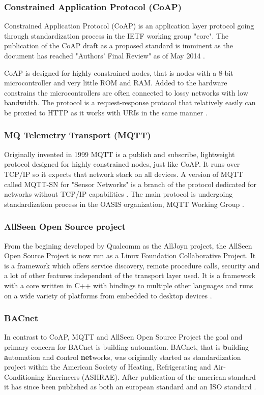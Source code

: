 \subsubsection{Constrained Application Protocol (CoAP)}
Constrained Application Protocol (CoAP) is an application layer protocol
going through standardization process in the IETF working group "core". The
publication of the CoAP draft as a proposed standard is imminent as the
document has reached "Authors' Final Review" as of May 2014 \cite{web:wgcore}.

CoAP is designed for highly constrained nodes, that is nodes with a 8-bit
microcontroller and very little ROM and RAM. Added to the hardware constrains
the microcontrollers are often connected to lossy networks with low bandwidth.
The protocol is a request-response protocol that relatively easily can be
proxied to HTTP as it works with URIs in the same manner \cite{web:draftcoap}.

\subsubsection{MQ Telemetry Transport (MQTT)}
Originally invented in 1999 MQTT is a publish and subscribe, lightweight
protocol designed for highly constrained nodes, just like CoAP. It runs
over TCP/IP so it expects that network stack on all devices. A version of MQTT
called MQTT-SN for "Sensor Networks" is a branch of the protocol dedicated for
networks without TCP/IP capabilities \cite{web:mqtt,web:mqtt-sn}. The main
protocol is undergoing standardization process in the OASIS organization, MQTT
Working Group \cite{web:oasis-mqtt}.

\subsubsection{AllSeen Open Source project}
From the begining developed by Qualcomm as the AllJoyn project, the AllSeen
Open Source Project is now run as a Linux Foundation Collaborative Project.
It is a framework which offers service discovery, remote procedure calls,
security and a lot of other features independent of the transport layer used.
It is a framework with a core written in C++ with bindings to multiple other
languages and runs on a wide variety of platforms from embedded to desktop
devices \cite{web:alljoyn,web:allseen}.

\subsubsection{BACnet}
In contrast to CoAP, MQTT and AllSeen Open Source Project the goal and primary
concern for BACnet is building automation. BACnet, that is \textbf{b}uilding
\textbf{a}utomation and \textbf{c}ontrol \textbf{net}works, was originally
started as standardization project within the American Society of Heating,
Refrigerating and Air-Conditioning Enerineers (ASHRAE). After publication of
the american standard it has since been published as both an european standard
and an ISO standard \cite{web:bacnet}.


